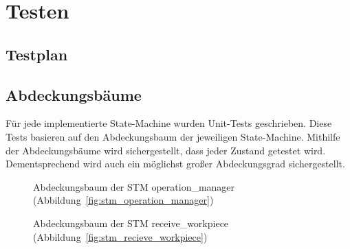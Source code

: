\chapter{Testen}\label{ch:testen}



\section{Testplan}\label{sec:testplan}





\section{Abdeckungsbäume}\label{sec:abdeckungsbaueme}

Für jede implementierte State-Machine wurden Unit-Tests geschrieben.
Diese Tests basieren auf den Abdeckungsbaum der jeweiligen State-Machine.
Mithilfe der Abdeckungsbäume wird sichergestellt, dass jeder Zustand getestet wird.
Dementsprechend wird auch ein möglichst großer Abdeckungsgrad sichergestellt.

\begin{figure}
    \caption{Abdeckungsbaum der STM operation\_manager
        (Abbildung~\ref{fig:stm_operation_manager})}
    \label{fig:tt_operation_manager}
\end{figure}

\begin{figure}
    \caption{Abdeckungsbaum der STM receive\_workpiece
        (Abbildung~\ref{fig:stm_recieve_workpiece})}
    \label{fig:tt_recieve_workpiece}
\end{figure}

